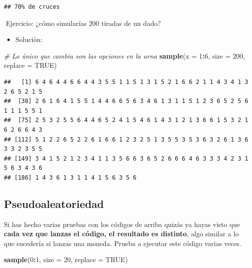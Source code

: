 \documentclass[11pt,]{book}
\newenvironment{Shaded}{\begin{snugshade}}{\end{snugshade}}
\newcommand{\CommentTok}[1]{\textcolor[rgb]{0.37,0.37,0.37}{\textit{#1}}}
\newcommand{\DataTypeTok}[1]{\textcolor[rgb]{0.27,0.27,0.27}{#1}}
\newcommand{\DecValTok}[1]{\textcolor[rgb]{0.06,0.06,0.06}{#1}}
\newcommand{\KeywordTok}[1]{\textcolor[rgb]{0.27,0.27,0.27}{\textbf{#1}}}
\newcommand{\NormalTok}[1]{#1}
\newcommand{\OperatorTok}[1]{\textcolor[rgb]{0.43,0.43,0.43}{\textbf{#1}}}
\newcommand{\OtherTok}[1]{\textcolor[rgb]{0.37,0.37,0.37}{#1}}
\providecommand{\tightlist}{%
  \setlength{\itemsep}{0pt}\setlength{\parskip}{0pt}}
\begin{document}
\begin{verbatim}
## 70% de cruces
\end{verbatim}

📝Ejercicio: ¿cómo simularías 200 tiradas de un dado?

\begin{itemize}
\tightlist
\item
  Solución:
\end{itemize}

\begin{Shaded}
\begin{Highlighting}[]
\CommentTok{# Lo único que cambia son las opciones en la urna}
\KeywordTok{sample}\NormalTok{(}\DataTypeTok{x =} \DecValTok{1}\OperatorTok{:}\DecValTok{6}\NormalTok{, }\DataTypeTok{size =} \DecValTok{200}\NormalTok{, }\DataTypeTok{replace =} \OtherTok{TRUE}\NormalTok{)}
\end{Highlighting}
\end{Shaded}

\begin{verbatim}
##   [1] 6 4 6 4 4 6 6 4 4 3 5 5 1 1 5 1 3 1 5 2 1 6 6 2 1 1 4 3 4 1 3 2 6 5 2 1 5
##  [38] 2 6 1 6 4 1 5 5 1 4 4 6 6 5 6 3 4 6 1 3 1 1 5 1 2 3 6 5 2 5 6 1 1 1 5 5 1
##  [75] 2 5 3 2 5 5 6 4 4 6 5 2 4 1 5 4 6 1 4 3 1 2 1 3 6 6 1 5 3 2 1 6 2 6 6 4 3
## [112] 5 1 2 2 6 5 2 2 6 1 6 6 1 2 3 2 5 1 3 5 5 3 5 3 6 3 2 6 1 3 6 3 3 2 3 5 5
## [149] 3 4 1 5 2 1 2 3 4 1 1 3 5 6 6 3 6 5 2 6 6 6 4 6 3 3 3 4 2 3 1 5 6 3 4 3 6
## [186] 1 4 3 6 1 3 1 1 4 1 5 6 3 5 6
\end{verbatim}

\hypertarget{pseudoaleatorio}{%
\subsection{Pseudoaleatoriedad}\label{pseudoaleatorio}}

Si has hecho varias pruebas con los códigos de arriba quizás ya hayas visto que \textbf{cada vez que lanzas el código, el resultado es distinto}, algo similar a lo que sucedería si lanzas una moneda. Prueba a ejecutar este código varias veces.

\begin{Shaded}
\begin{Highlighting}[]
\KeywordTok{sample}\NormalTok{(}\DecValTok{0}\OperatorTok{:}\DecValTok{1}\NormalTok{, }\DataTypeTok{size =} \DecValTok{20}\NormalTok{, }\DataTypeTok{replace =} \OtherTok{TRUE}\NormalTok{)}
\end{Highlighting}
\end{Shaded}
\end{document}
